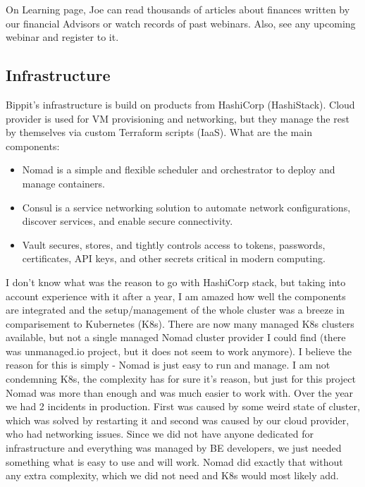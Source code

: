 \begin{example}[Education]
    On Learning page, Joe can read thousands of articles about finances written by our financial Advisors or watch records of past webinars. Also, see any upcoming webinar and register to it.
\end{example}



\subsection{Infrastructure}
Bippit's infrastructure is build on products from HashiCorp (HashiStack). Cloud provider is used for VM provisioning and networking, but they manage the rest by themselves via custom Terraform scripts (IaaS). What are the main components:
\begin{itemize}
    \item Nomad  is a simple and flexible scheduler and orchestrator to deploy and manage containers. \cite{NOMAD}
    \item Consul is a service networking solution to automate network configurations, discover services, and enable secure connectivity. \cite{CONSUL}
    \item Vault secures, stores, and tightly controls access to tokens, passwords, certificates, API keys, and other secrets critical in modern computing. \cite{VAULT}
\end{itemize}

I don't know what was the reason to go with HashiCorp stack, but taking into account experience with it after a year, I am amazed how well the components are integrated and the setup/management of the whole cluster was a breeze in comparisement to Kubernetes (K8s). There are now many managed K8s clusters available, but not a single managed Nomad cluster provider I could find (there was unmanaged.io project, but it does not seem to work anymore). I believe the reason for this is simply - Nomad is just easy to run and manage. I am not condemning K8s, the complexity has for sure it's reason, but just for this project Nomad was more than enough and was much easier to work with. Over the year we had 2 incidents in production. First was caused by some weird state of cluster, which was solved by restarting it and second was caused by our cloud provider, who had networking issues. Since we did not have anyone dedicated for infrastructure and everything was managed by BE developers, we just needed something what is easy to use and will work. Nomad did exactly that without any extra complexity, which we did not need and K8s would most likely add.


